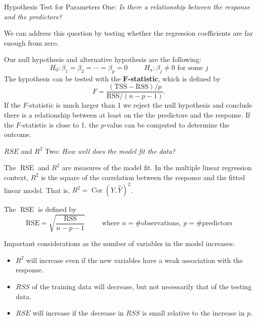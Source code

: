 \documentclass[
  ignorenonframetext,
  aspectratio=169,
]{beamer}
\begin{document}
\begin{frame}{Hypothesis Test for Parameters}
\protect\hypertarget{hypothesis-test-for-parameters}{}
One: \emph{Is there a relationship between the response and the
predictors?}

We can address this question by testing whether the regression
coefficients are far enough from zero.

Our null hypothesis and alternative hypothesis are the following: \[
H_{0}: \beta_{1}=\beta_{2}=\cdots=\beta_{p}=0
\hspace{1cm}
H_{a}: \beta_{j} \neq 0 \text{ for some } j
\] The hypothesis can be tested with the
\(\mathbf{F}\)\textbf{-statistic}, which is defined by \[
F=\frac{(\mathrm{TSS}-\mathrm{RSS}) / p}{\mathrm{RSS} /(n-p-1)}.
\] If the \(F\)-statistic is much larger than 1 we reject the null
hypothesis and conclude there is a relationship between at least on the
the predictors and the response. If the \(F\)-statistic is close to 1,
the \(p\)-value can be computed to determine the outcome.
\end{frame}

\begin{frame}{\(RSE\) and \(R^2\)}
\protect\hypertarget{rse-and-r2}{}
Two: \emph{How well does the model fit the data?}

The \(\operatorname{RSE}\) and \(R^2\) are measures of the model fit. In
the multiple linear regression context, \(R^2\) is the square of the
correlation between the response and the fitted linear model. That is,
\(R^2 = \operatorname{Cor}(Y, \hat Y)^2\).

The \(\operatorname{RSE}\) is defined by \[
\mathrm{RSE}=\sqrt{\frac{\mathrm{RSS}}{n-p-1} } \hspace{1cm} \text{where } n = \text{\# observations},\ p = \text{\# predictors}
\]

Important considerations as the number of variables in the model
increases:

\begin{itemize}
\item
  \(R^2\) will increase even if the new variables have a weak
  association with the response.
\item
  \(RSS\) of the training data will decrease, but not necessarily that
  of the testing data.
\item
  \(RSE\) will increase if the decrease in \(RSS\) is small relative to
  the increase in \(p\).
\end{itemize}
\end{frame}
\end{document}
